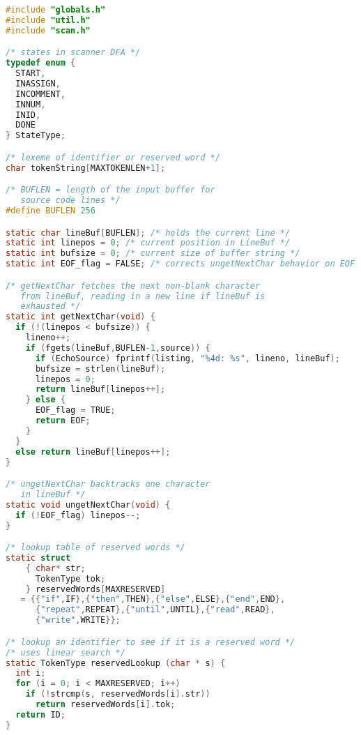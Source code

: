 \documentclass[lang=cn,10pt]{elegantbook}
\begin{document}
\begin{lstlisting}[caption={scan.c},language=c]
#include "globals.h"
#include "util.h"
#include "scan.h"

/* states in scanner DFA */
typedef enum {
  START,
  INASSIGN,
  INCOMMENT,
  INNUM,
  INID,
  DONE
} StateType;

/* lexeme of identifier or reserved word */
char tokenString[MAXTOKENLEN+1];

/* BUFLEN = length of the input buffer for
   source code lines */
#define BUFLEN 256

static char lineBuf[BUFLEN]; /* holds the current line */
static int linepos = 0; /* current position in LineBuf */
static int bufsize = 0; /* current size of buffer string */
static int EOF_flag = FALSE; /* corrects ungetNextChar behavior on EOF */

/* getNextChar fetches the next non-blank character
   from lineBuf, reading in a new line if lineBuf is
   exhausted */
static int getNextChar(void) {
  if (!(linepos < bufsize)) {
    lineno++;
    if (fgets(lineBuf,BUFLEN-1,source)) {
      if (EchoSource) fprintf(listing, "%4d: %s", lineno, lineBuf);
      bufsize = strlen(lineBuf);
      linepos = 0;
      return lineBuf[linepos++];
    } else {
      EOF_flag = TRUE;
      return EOF;
    }
  }
  else return lineBuf[linepos++];
}

/* ungetNextChar backtracks one character
   in lineBuf */
static void ungetNextChar(void) {
  if (!EOF_flag) linepos--;
}

/* lookup table of reserved words */
static struct
    { char* str;
      TokenType tok;
    } reservedWords[MAXRESERVED]
   = {{"if",IF},{"then",THEN},{"else",ELSE},{"end",END},
      {"repeat",REPEAT},{"until",UNTIL},{"read",READ},
      {"write",WRITE}};

/* lookup an identifier to see if it is a reserved word */
/* uses linear search */
static TokenType reservedLookup (char * s) {
  int i;
  for (i = 0; i < MAXRESERVED; i++)
    if (!strcmp(s, reservedWords[i].str))
      return reservedWords[i].tok;
  return ID;
}


\end{lstlisting}
\end{document}
